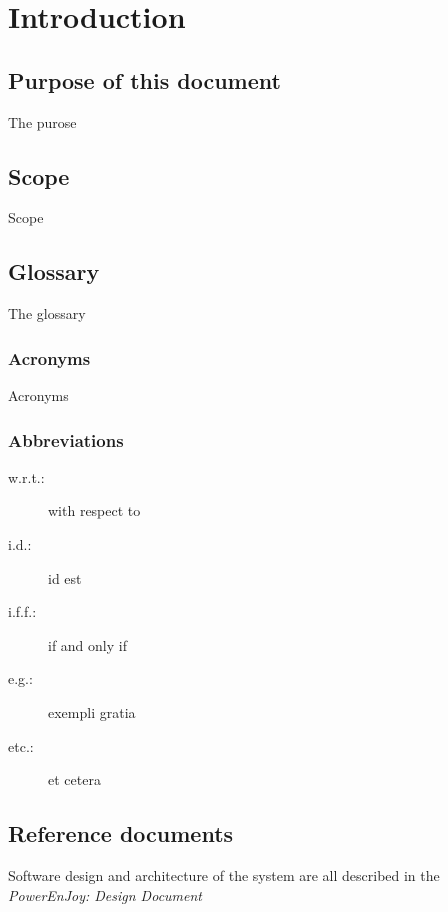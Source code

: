 \section{Introduction}

\subsection{Purpose of this document}
The purose

\subsection{Scope}
Scope

\subsection{Glossary}
The glossary

\subsubsection{Acronyms}
Acronyms
\subsubsection{Abbreviations}
	\begin{description}
		\item [w.r.t.:] with respect to
		\item [i.d.:] id est
		\item [i.f.f.:] if and only if
		\item [e.g.:] exempli gratia
		\item [etc.:] et cetera
	\end{description}

\subsection{Reference documents}
Software design and architecture of the system are all described in the \emph{PowerEnJoy: Design Document} \cite{DD}